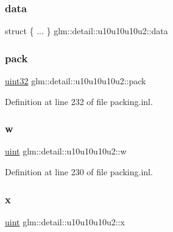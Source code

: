 \subsubsection{\texorpdfstring{data}{data}}
{\footnotesize\ttfamily struct \{ ... \}   glm\+::detail\+::u10u10u10u2\+::data}

\mbox{\label{unionglm_1_1detail_1_1u10u10u10u2_a8bb9d7804af09ba3790a4b5622321511}} 
\subsubsection{\texorpdfstring{pack}{pack}}
{\footnotesize\ttfamily \hyperlink{namespaceglm_1_1detail_ade6cfbf377022aaa391af8cd50489222}{uint32} glm\+::detail\+::u10u10u10u2\+::pack}



Definition at line 232 of file packing.\+inl.

\mbox{\label{unionglm_1_1detail_1_1u10u10u10u2_a54c0903e806192c618f70c9f437d48ec}} 
\subsubsection{\texorpdfstring{w}{w}}
{\footnotesize\ttfamily \hyperlink{group__core__precision_ga4fd29415871152bfb5abd588334147c8}{uint} glm\+::detail\+::u10u10u10u2\+::w}



Definition at line 230 of file packing.\+inl.

\mbox{\label{unionglm_1_1detail_1_1u10u10u10u2_ab4237d6f4aa001d47844075c42a8e16c}} 
\subsubsection{\texorpdfstring{x}{x}}
{\footnotesize\ttfamily \hyperlink{group__core__precision_ga4fd29415871152bfb5abd588334147c8}{uint} glm\+::detail\+::u10u10u10u2\+::x}



